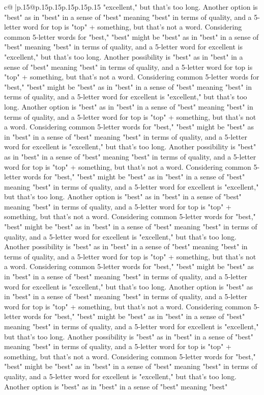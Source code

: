 \documentclass{article}
\begin{document}
{\begin{supertabular}{c@{$\;$}|p{.15\linewidth}@{}p{.15\linewidth}p{.15\linewidth}p{.15\linewidth}p{.15\linewidth}p{.15\linewidth}}
{{{"excellent," but that's too long. Another option is "best" as in "best" in a sense of "best" meaning "best" in terms of quality, and a 5{-}letter word for top is "top" + something, but that's not a word. Considering common 5{-}letter words for "best," "best" might be "best" as in "best" in a sense of "best" meaning "best" in terms of quality, and a 5{-}letter word for excellent is "excellent," but that's too long. Another possibility is "best" as in "best" in a sense of "best" meaning "best" in terms of quality, and a 5{-}letter word for top is "top" + something, but that's not a word. Considering common 5{-}letter words for "best," "best" might be "best" as in "best" in a sense of "best" meaning "best" in terms of quality, and a 5{-}letter word for excellent is "excellent," but that's too long. Another option is "best" as in "best" in a sense of "best" meaning "best" in terms of quality, and a 5{-}letter word for top is "top" + something, but that's not a word. Considering common 5{-}letter words for "best," "best" might be "best" as in "best" in a sense of "best" meaning "best" in terms of quality, and a 5{-}letter word for excellent is "excellent," but that's too long. Another possibility is "best" as in "best" in a sense of "best" meaning "best" in terms of quality, and a 5{-}letter word for top is "top" + something, but that's not a word. Considering common 5{-}letter words for "best," "best" might be "best" as in "best" in a sense of "best" meaning "best" in terms of quality, and a 5{-}letter word for excellent is "excellent," but that's too long. Another option is "best" as in "best" in a sense of "best" meaning "best" in terms of quality, and a 5{-}letter word for top is "top" + something, but that's not a word. Considering common 5{-}letter words for "best," "best" might be "best" as in "best" in a sense of "best" meaning "best" in terms of quality, and a 5{-}letter word for excellent is "excellent," but that's too long. Another possibility is "best" as in "best" in a sense of "best" meaning "best" in terms of quality, and a 5{-}letter word for top is "top" + something, but that's not a word. Considering common 5{-}letter words for "best," "best" might be "best" as in "best" in a sense of "best" meaning "best" in terms of quality, and a 5{-}letter word for excellent is "excellent," but that's too long. Another option is "best" as in "best" in a sense of "best" meaning "best" in terms of quality, and a 5{-}letter word for top is "top" + something, but that's not a word. Considering common 5{-}letter words for "best," "best" might be "best" as in "best" in a sense of "best" meaning "best" in terms of quality, and a 5{-}letter word for excellent is "excellent," but that's too long. Another possibility is "best" as in "best" in a sense of "best" meaning "best" in terms of quality, and a 5{-}letter word for top is "top" + something, but that's not a word. Considering common 5{-}letter words for "best," "best" might be "best" as in "best" in a sense of "best" meaning "best" in terms of quality, and a 5{-}letter word for excellent is "excellent," but that's too long. Another option is "best" as in "best" in a sense of "best" meaning "best" }}}
\end{supertabular}}
\end{document}
